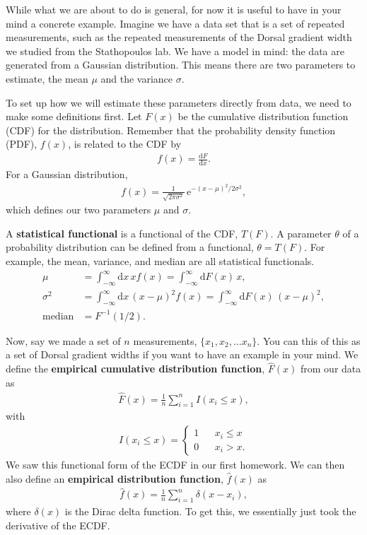 While what we are about to do is general, for now it is useful to have in your mind a concrete example. Imagine we have a data set that is a set of repeated measurements, such as the repeated measurements of the Dorsal gradient width we studied from the Stathopoulos lab. We have a model in mind: the data are generated from a Gaussian distribution. This means there are two parameters to estimate, the mean $\mu$ and the variance $\sigma$.

To set up how we will estimate these parameters directly from data, we need to make some definitions first. Let $F(x)$ be the cumulative distribution function (CDF) for the distribution. Remember that the probability density function (PDF), $f(x)$, is related to the CDF by
\begin{align}
    f(x) = \frac{\mathrm{d}F}{\mathrm{d}x}.
\end{align}
For a Gaussian distribution,
\begin{align}
    f(x) = \frac{1}{\sqrt{2\pi\sigma^2}}\,\mathrm{e}^{-(x-\mu)^2/2\sigma^2},
\end{align}
which defines our two parameters $\mu$ and $\sigma$.

A \textbf{statistical functional} is a functional of the CDF, $T(F)$. A parameter $\theta$ of a probability distribution can be defined from a functional, $\theta = T(F)$. For example, the mean, variance, and median are all statistical functionals.
\begin{align}
    \mu &= \int_{-\infty}^\infty \mathrm{d}x\,xf(x) = \int_{-\infty}^\infty \mathrm{d}F(x)\,x, \\
    \sigma^2 &= \int_{-\infty}^\infty \mathrm{d}x\,(x-\mu)^2f(x) = \int_{-\infty}^\infty \mathrm{d}F(x)\,(x-\mu)^2, \\
    \text{median} &= F^{-1}(1/2).
\end{align}

Now, say we made a set of $n$ measurements, $\{x_1, x_2, \ldots x_n\}$. You can this of this as a set of Dorsal gradient widths if you want to have an example in your mind. We define the \textbf{empirical cumulative distribution function}, $\hat{F}(x)$ from our data as
\begin{align}
    \hat{F}(x) = \frac{1}{n}\sum_{i=1}^n I(x_i \le x),
\end{align}
with
\begin{align}
    I(x_i \le x) = \left\{
    \begin{array}{ccl}
        1 && x_i \le x \\[0.5em]
        0 && x_i > x.
    \end{array}
    \right.
\end{align}
We saw this functional form of the ECDF in our first homework. We can then also define an \textbf{empirical distribution function}, $\hat{f}(x)$ as
\begin{align}
    \hat{f}(x) = \frac{1}{n}\sum_{i=1}^n \delta(x - x_i),
\end{align}
where $\delta(x)$ is the Dirac delta function. To get this, we essentially just took the derivative of the ECDF.

